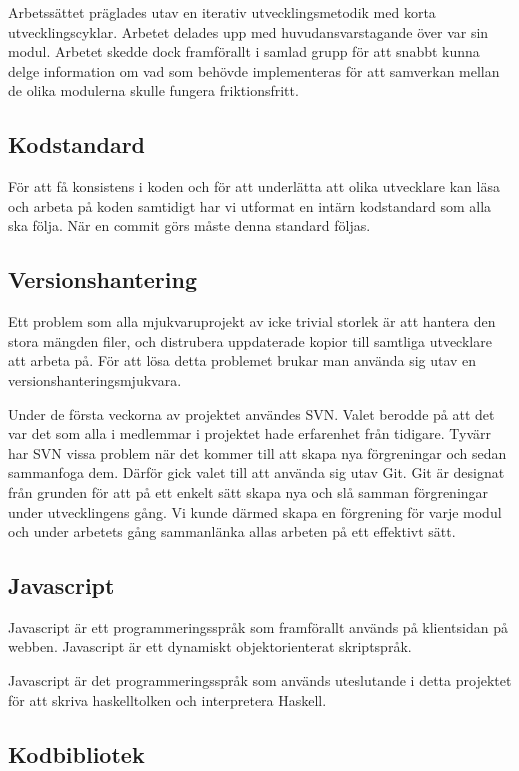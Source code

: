 Arbetssättet präglades utav en iterativ utvecklingsmetodik med korta utvecklingscyklar. Arbetet delades upp med huvudansvarstagande över var sin modul. Arbetet skedde dock framförallt i samlad grupp för att snabbt kunna delge information om vad som behövde implementeras för att samverkan mellan de olika modulerna skulle fungera friktionsfritt.

\subsection{Kodstandard} 
För att få konsistens i koden och för att underlätta att olika utvecklare kan läsa och arbeta på koden samtidigt har vi utformat en intärn kodstandard som alla ska följa.
När en commit görs måste denna standard följas.

\subsection{Versionshantering} 
Ett problem som alla mjukvaruprojekt av icke trivial storlek är att hantera den stora mängden filer, och distrubera uppdaterade kopior till samtliga utvecklare att arbeta på.
För att lösa detta problemet brukar man använda sig utav en versionshanteringsmjukvara. 

Under de första veckorna av projektet användes SVN. Valet berodde på att det var det som alla i medlemmar i projektet hade erfarenhet från tidigare. Tyvärr har SVN vissa problem när det kommer till att skapa nya förgreningar och sedan sammanfoga dem. Därför gick valet till att använda sig utav Git. Git är designat från grunden för att på ett enkelt sätt skapa nya och slå samman förgreningar under utvecklingens gång. Vi kunde därmed skapa en förgrening för varje modul och under arbetets gång sammanlänka allas arbeten på ett effektivt sätt. 

\subsection{Javascript} 
Javascript \citep{javascript} är ett programmeringsspråk som framförallt används på klientsidan på webben. Javascript är ett dynamiskt objektorienterat skriptspråk.

Javascript är det programmeringsspråk som används uteslutande i detta projektet för att skriva haskelltolken och interpretera Haskell.

\subsection{Kodbibliotek}

